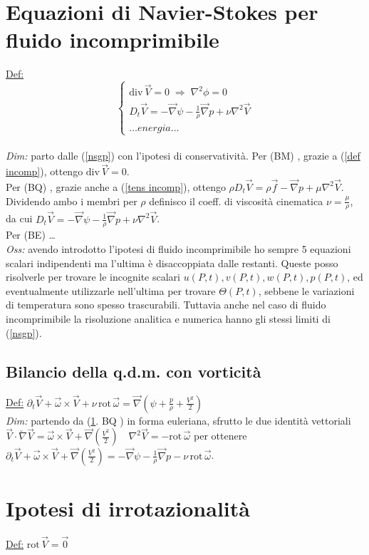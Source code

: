 \documentclass[11pt,a4paper]{report}
\newcommand{\sz}[1]{\scriptsize #1\normalsize}
\begin{document}
	\section{Equazioni di Navier-Stokes per fluido incomprimibile} \label{ns inc}
	\underline{Def:}$$\begin{cases}\mathrm{div}\,\vec V=0\;\Rightarrow\;\nabla^2\phi=0\\
	D_t\vec V=-\vec\nabla\psi-\frac{1}{\rho}\vec\nabla p+\nu\nabla^2\vec V\\
	\ldots energia\ldots\end{cases}$$\\
	\textit{Dim:} parto dalle (\ref{nsgp}) con l'ipotesi di conservatività. Per \sz{ (BM) }, grazie a (\ref{def incomp}), ottengo $\mathrm{div}\,\vec V=0$.\\
	Per \sz{ (BQ) }, grazie anche a (\ref{tens incomp}), ottengo $\rho D_t\vec V=\rho\vec f-\vec\nabla p+\mu\nabla^2\vec V$. Dividendo ambo i membri per $\rho$ definisco il coeff. di viscosità cinematica $\nu=\frac{\mu}{\rho}$, da cui $D_t\vec V=-\vec\nabla\psi-\frac 1\rho\vec\nabla p+\nu\nabla^2\vec V$.\\
	Per \sz{ (BE) } \ldots\\
	\textit{Oss:} avendo introdotto l'ipotesi di fluido incomprimibile ho sempre 5 equazioni scalari indipendenti ma l'ultima è disaccoppiata dalle restanti. Queste posso risolverle per trovare le incognite scalari $u(P,t),v(P,t),w(P,t),p(P,t)$, ed eventualmente utilizzarle nell'ultima per trovare $\Theta(P,t)$, sebbene le variazioni di temperatura sono spesso trascurabili. Tuttavia anche nel caso di fluido incomprimibile la risoluzione analitica e numerica hanno gli stessi limiti di (\ref{nsgp}).
		\subsection{Bilancio della q.d.m. con vorticità}	\label{qdm vort}
		\underline{Def:} $\partial_t\vec V+\vec\omega\times\vec V+\nu\,\mathrm{rot}\,\vec\omega=\vec\nabla(\psi+\frac p\rho+\frac{V^2}{2})$\\
		\textit{Dim:} partendo da (\ref{ns inc}.\sz{ BQ }) in forma euleriana, sfrutto le due identità vettoriali $\vec V\cdot\utilde\nabla\vec V=\vec\omega\times\vec V+\vec\nabla(\frac{V^2}{2})\quad\nabla^2\vec V=-\mathrm{rot}\,\vec\omega$ per ottenere $\partial_t\vec V+\vec\omega\times\vec V+\vec\nabla(\frac{V^2}{2})=-\vec\nabla\psi-\frac 1\rho\vec\nabla p-\nu\,\mathrm{rot}\,\vec\omega$.
	
	\section{Ipotesi di irrotazionalità}
	\underline{Def:} $\mathrm{rot}\,\vec V=\vec 0$
	\begin{center}\underline{}\end{center}
	
\end{document}
